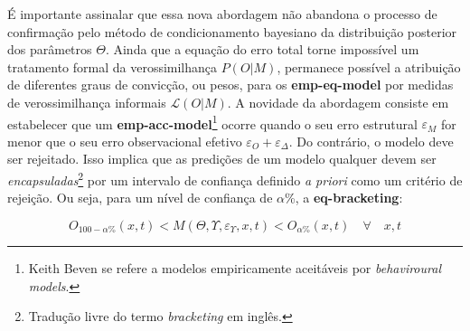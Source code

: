 \documentclass[./main.tex]{subfiles}
\begin{document}
\noindent É importante assinalar que essa nova abordagem não abandona o processo de confirmação pelo método de condicionamento bayesiano da distribuição posterior dos parâmetros $\Theta$. Ainda que a equação do erro total torne impossível um tratamento formal da verossimilhança $P(O|M)$, permanece possível a atribuição de diferentes graus de convicção, ou pesos, para os \textbf{\gls{emp-eq-model}} por medidas de verossimilhança informais $\mathcal{L}(O|M)$. A novidade da abordagem consiste em estabelecer que um \textbf{\gls{emp-acc-model}}\footnote{Keith Beven se refere a modelos empiricamente aceitáveis por \textit{behaviroural models}.} ocorre quando o seu erro estrutural $\varepsilon_M$ for menor que o seu erro observacional efetivo $\varepsilon_O + \varepsilon_{\Delta}$. Do contrário, o modelo deve ser rejeitado. Isso implica que as predições de um modelo qualquer devem ser \textit{encapsuladas}\footnote{Tradução livre do termo \textit{bracketing} em inglês.} por um intervalo de confiança definido \textit{a priori} como um critério de rejeição. Ou seja, para um nível de confiança de $\alpha$\%, a \textbf{\gls{eq-bracketing}}:
\begin{linenomath*}
\begin{equation}
\label{eq:bracketing}
    O_{100-\alpha\%}(x, t) < M(\Theta, \Upsilon, \varepsilon_{\Upsilon}, x, t) < O_{\alpha\%}(x, t) \quad \forall \quad x, t
\end{equation}
\end{linenomath*}
\end{document}
